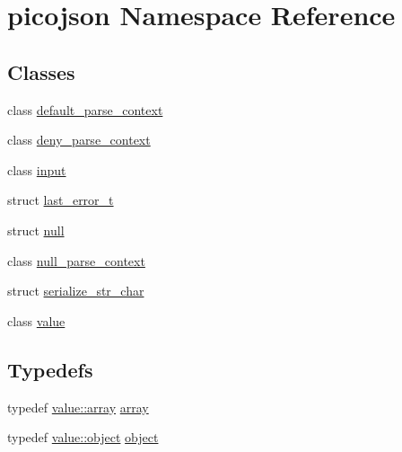 \hypertarget{namespacepicojson}{}\section{picojson Namespace Reference}
\label{namespacepicojson}
\subsection*{Classes}
\begin{DoxyCompactItemize}
\item 
class \hyperlink{classpicojson_1_1default__parse__context}{default\+\_\+parse\+\_\+context}
\item 
class \hyperlink{classpicojson_1_1deny__parse__context}{deny\+\_\+parse\+\_\+context}
\item 
class \hyperlink{classpicojson_1_1input}{input}
\item 
struct \hyperlink{structpicojson_1_1last__error__t}{last\+\_\+error\+\_\+t}
\item 
struct \hyperlink{structpicojson_1_1null}{null}
\item 
class \hyperlink{classpicojson_1_1null__parse__context}{null\+\_\+parse\+\_\+context}
\item 
struct \hyperlink{structpicojson_1_1serialize__str__char}{serialize\+\_\+str\+\_\+char}
\item 
class \hyperlink{classpicojson_1_1value}{value}
\end{DoxyCompactItemize}
\subsection*{Typedefs}
\begin{DoxyCompactItemize}
\item 
typedef \hyperlink{classpicojson_1_1value_adeff4fdf7ee5675eeb7686bb89233c43}{value\+::array} \hyperlink{namespacepicojson_ac1e72166adfe3d96dc58cddc7ebd536a}{array}
\item 
typedef \hyperlink{classpicojson_1_1value_a7d7da11d54d7b983a902d28367bda9c1}{value\+::object} \hyperlink{namespacepicojson_a3e769a5e2dbffd9a9309e1dc2d67975b}{object}
\end{DoxyCompactItemize}
